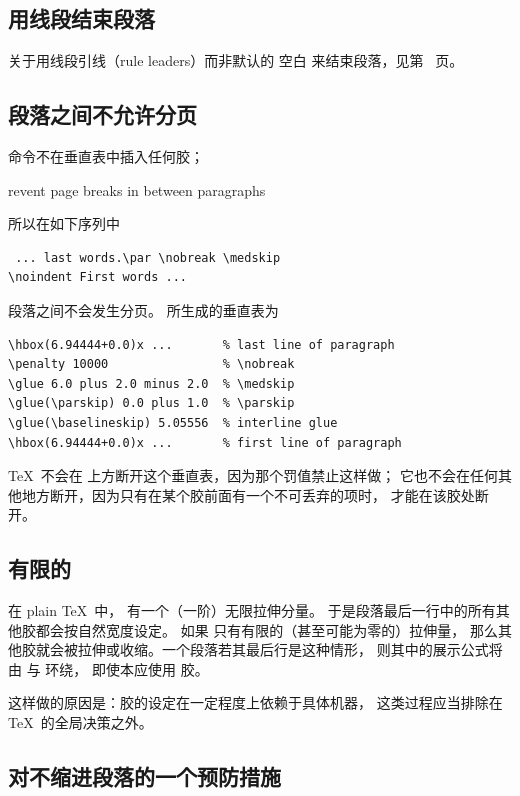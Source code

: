 \documentclass[a4paper]{rapport3}
\def\howto#1\par{}
\begin{document}
\subsection{用线段结束段落}

关于用线段引线（rule leaders）而非默认的  空白
来结束段落，见第~\pageref{par:leaders:end} 页。

\subsection{段落之间不允许分页}

 命令不在垂直表中插入任何胶；
\howto Prevent page breaks in between paragraphs\par
所以在如下序列中
\begin{verbatim}
 ... last words.\par \nobreak \medskip 
\noindent First words ...
\end{verbatim}
段落之间不会发生分页。
所生成的垂直表为
\begin{verbatim}
\hbox(6.94444+0.0)x ...       % last line of paragraph
\penalty 10000                % \nobreak
\glue 6.0 plus 2.0 minus 2.0  % \medskip
\glue(\parskip) 0.0 plus 1.0  % \parskip
\glue(\baselineskip) 5.05556  % interline glue
\hbox(6.94444+0.0)x ...       % first line of paragraph
\end{verbatim}
\TeX\ 不会在  上方断开这个垂直表，因为那个罚值禁止这样做；
它也不会在任何其他地方断开，因为只有在某个胶前面有一个不可丢弃的项时，
才能在该胶处断开。

\subsection{有限的 }

在 plain \TeX\ 中， 有一个（一阶）无限拉伸分量。
于是段落最后一行中的所有其他胶都会按自然宽度设定。
如果  只有有限的（甚至可能为零的）拉伸量，
那么其他胶就会被拉伸或收缩。一个段落若其最后行是这种情形，
则其中的展示公式将由  与  环绕，
即使本应使用  胶。

这样做的原因是：胶的设定在一定程度上依赖于具体机器，
这类过程应当排除在 \TeX\ 的全局决策之外。

\subsection{对不缩进段落的一个预防措施}
\end{document}
